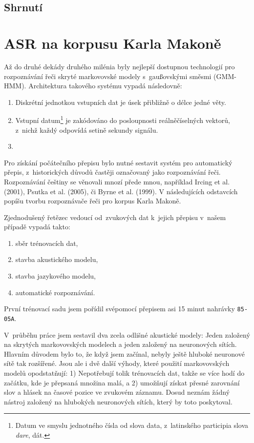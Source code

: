 \subsection{Shrnutí}



\section{ASR na korpusu Karla Makoně}

Až do druhé dekády druhého milénia byly nejlepší dostupnou technologií pro
rozpoznávání řeči skryté markovovské modely s~gaußovskými směsmi (GMM-HMM).
Architektura takového systému vypadá následovně:

\begin{enumerate}
\item{Diskrétní jednotkou vstupních dat je úsek přibližně o délce jedné věty.}
\item{Vstupní datum\footnote{Datum ve smyslu jednotného čísla od slova data,
z~latinského participia slova \textit{dare}, dát.} je zakódováno do posloupnosti
reálněčíselných vektorů, z~nichž každý odpovídá setině sekundy signálu.}
\item{}
\end{enumerate}

Pro získání počátečního přepisu bylo nutné sestavit
systém pro automatický přepis, z~historických důvodů častěji označovaný jako
rozpoznávání řeči. Rozpoznávání češtiny se věnovali mnozí přede mnou,
například Ircing et al. (2001)\cite{ircing2001large}, Psutka et al.
(2005)\cite{psutka2005automatic}, či Byrne et al. (1999)\cite{byrne1999large}.
V následujících odstavcích popíšu tvorbu rozpoznávače řeči pro korpus Karla
Makoně.

Zjednodušený řetězec vedoucí od~zvukových dat k~jejich přepisu v~našem případě
vypadá takto:\begin{enumerate}
\item{sběr trénovacích dat,}
\item{stavba akustického modelu,}
\item{stavba jazykového modelu,}
\item{automatické rozpoznávání.}
\end{enumerate}

První trénovací sadu jsem pořídil svépomocí přepisem asi 15 minut nahrávky
\texttt{85-05A}.

V~průběhu práce jsem sestavil dva zcela odlišné akustické modely: Jeden založený
na skrytých markovovských modelech a jeden založený na neuronových sítích.
Hlavním důvodem bylo to, že když jsem začínal, nebyly ještě hluboké neuronové
sítě tak rozšířené. Jsou ale i dvě další výhody, které použití markovovských
modelů opodstatňují: 1) Nepotřebují tolik trénovacích dat, takže se více hodí do
začátku, kde je přepsaná množina malá, a 2) umožňují získat přesné zarovnání
slov a hlásek na časové pozice ve zvukovém záznamu. Dosud neznám žádný nástroj
založený na hlubokých neuronových sítích, který by toto poskytoval.

